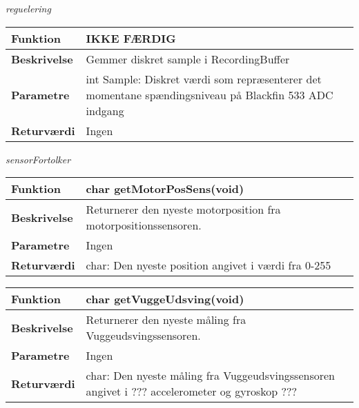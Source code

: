 \textit{reguelering} \\

\begin{center}
    \begin{tabular}{ | l | p{10cm} |}
    \hline
    \textbf{Funktion}	 	& IKKE FÆRDIG								\\ \hline
    \textbf{Beskrivelse} 	& Gemmer diskret sample i RecordingBuffer					\\ \hline
    \textbf{Parametre}		& int Sample: Diskret værdi som repræsenterer det momentane spændingsniveau på Blackfin 533 ADC indgang														 		\\ \hline
    \textbf{Returværdi} 	& Ingen		 												\\ \hline
    \end{tabular}
\end{center}

\textit{sensorFortolker} \\

\begin{center}
    \begin{tabular}{ | l | p{10cm} |}
    \hline
    \textbf{Funktion}	 	& char getMotorPosSens(void)								\\ \hline
    \textbf{Beskrivelse} 	& Returnerer den nyeste motorposition fra motorpositionssensoren.					\\ \hline
    \textbf{Parametre}		& Ingen								 		\\ \hline
    \textbf{Returværdi} 	& char: Den nyeste position angivet i værdi fra 0-255		 												\\ \hline
    \end{tabular}
\end{center}

\begin{center}
    \begin{tabular}{ | l | p{10cm} |}
    \hline
    \textbf{Funktion}	 	& char getVuggeUdsving(void)										\\ \hline
    \textbf{Beskrivelse} 	& Returnerer den nyeste måling fra Vuggeudsvingssensoren.		\\ \hline
    \textbf{Parametre}		& Ingen			 										\\ \hline
    \textbf{Returværdi} 	& char: Den nyeste måling fra Vuggeudsvingssensoren angivet i ??? accelerometer og gyroskop ???		 											\\ \hline
    \end{tabular}
\end{center}

